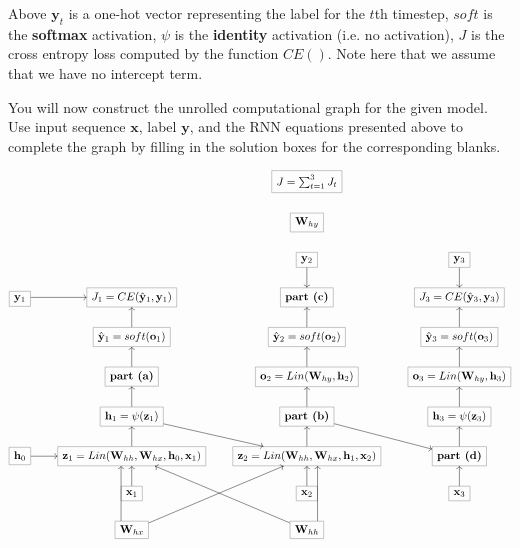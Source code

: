 \documentclass[11pt,addpoints,answers]{exam}
\newcommand{\hv}{\mathbf{h}}
\newcommand{\ov}{\mathbf{o}}
\newcommand{\xv}{\mathbf{x}}
\newcommand{\yv}{\mathbf{y}}
\newcommand{\zv}{\mathbf{z}}
\newcommand{\Wv}{\mathbf{W}}
\begin{document}
\begin{questions}
\begin{parts}
Above $\yv_t$ is a one-hot vector representing the label for the $t$th timestep, $soft$ is the \textbf{softmax} activation, $\psi$ is the \textbf{identity} activation (i.e. no activation), $J$ is the cross entropy loss computed by the function $CE()$. Note here that we assume that we have no intercept term. 

\begin{subparts}

\clearpage
    \subpart[4] You will now construct the unrolled computational graph for the given model.
    Use input sequence $\xv$, label $\yv$, and the RNN equations presented above to complete the graph by filling in the solution boxes for the corresponding blanks.\\

    \begin{center}
    \[\begin{tikzcd}[cells={nodes={draw=gray}}]
	&& {J = \sum_{t=1}^3 J_t} \\
	&& {\Wv_{hy}} \\
	&& {\yv_2} & {\yv_3} \\
	{\yv_1} & {J_1 = CE(\hat{\yv}_{1}, \yv_1)} & {\textbf{part (c)}} & {J_3 = CE(\hat{\yv}_{3}, \yv_3)} \\
	& {\hat{\yv}_1 = soft(\ov_1)} & {\hat{\yv}_2 = soft(\ov_2)} & {\hat{\yv}_3 = soft(\ov_3)} \\
	& {\textbf{part (a)}} & {\ov_2 = Lin(\Wv_{hy}, \hv_2)} & {\ov_3 = Lin(\Wv_{hy}, \hv_3)} \\
	& {\hv_1 = \psi(\zv_1)} & {\textbf{part (b)}} & {\hv_3 = \psi(\zv_3)} \\
	{\hv_0} & {\zv_1 = Lin(\Wv_{hh}, \Wv_{hx},\hv_0,\xv_1)} & {\zv_2 = Lin(\Wv_{hh}, \Wv_{hx},\hv_1,\xv_2)} & {\textbf{part (d)}} \\
	& {\xv_1} & {\xv_2} & {\xv_3} \\
	& {\Wv_{hx}} & {\Wv_{hh}}
	\arrow[from=8-1, to=8-2]
	\arrow[from=9-2, to=8-2]
	\arrow[from=8-2, to=7-2]
	\arrow[from=7-2, to=8-3]
	\arrow[from=7-2, to=6-2]
	\arrow[from=6-2, to=5-2]
	\arrow[from=5-2, to=4-2]
	\arrow[from=4-1, to=4-2]
	\arrow[from=9-3, to=8-3]
	\arrow[from=8-3, to=7-3]
	\arrow[from=7-3, to=6-3]
	\arrow[from=6-3, to=5-3]
	\arrow[from=5-3, to=4-3]
	\arrow[from=3-3, to=4-3]
	\arrow[from=3-4, to=4-4]
	\arrow[from=5-4, to=4-4]
	\arrow[from=6-4, to=5-4]
	\arrow[from=7-4, to=6-4]
	\arrow[from=8-4, to=7-4]
	\arrow[from=7-3, to=8-4]
	\arrow[from=9-4, to=8-4]
	\arrow[shift left=4, from=10-2, to=8-2]
	\arrow[from=10-2, to=8-3]
	\arrow[from=10-3, to=8-2]
	\arrow[shift right=4, from=10-3, to=8-3]

\end{tikzcd}\]
\end{center}
\end{subparts}
\end{parts}
\end{questions}
\end{document}

